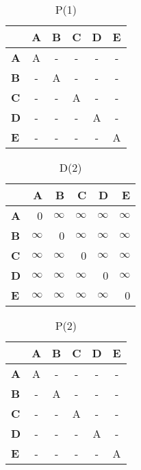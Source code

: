 \documentclass{article}
\newcommand{\INF}{$\infty$}
\begin{document}
\begin{table}[H]\centering
\caption{P(1)}
\begin{tabular}{l c c c c c}
\toprule
 & \textbf{A} & \textbf{B} & \textbf{C} & \textbf{D} & \textbf{E}\\\midrule
\textbf{A} & \cellcolor{yellow!30}A & - & - & - & - \\
\textbf{B} & - & \cellcolor{yellow!30}A & - & - & - \\
\textbf{C} & - & - & \cellcolor{yellow!30}A & - & - \\
\textbf{D} & - & - & - & \cellcolor{yellow!30}A & - \\
\textbf{E} & - & - & - & - & \cellcolor{yellow!30}A \\
\bottomrule
\end{tabular}
\end{table}

\begin{table}[H]\centering
\caption{D(2)}
\begin{tabular}{l r r r r r}
\toprule
 & \textbf{A} & \textbf{B} & \textbf{C} & \textbf{D} & \textbf{E}\\\midrule
\textbf{A} & 0 & \INF & \INF & \INF & \INF \\
\textbf{B} & \INF & 0 & \INF & \INF & \INF \\
\textbf{C} & \INF & \INF & 0 & \INF & \INF \\
\textbf{D} & \INF & \INF & \INF & 0 & \INF \\
\textbf{E} & \INF & \INF & \INF & \INF & 0 \\
\bottomrule
\end{tabular}
\end{table}

\begin{table}[H]\centering
\caption{P(2)}
\begin{tabular}{l c c c c c}
\toprule
 & \textbf{A} & \textbf{B} & \textbf{C} & \textbf{D} & \textbf{E}\\\midrule
\textbf{A} & A & - & - & - & - \\
\textbf{B} & - & A & - & - & - \\
\textbf{C} & - & - & A & - & - \\
\textbf{D} & - & - & - & A & - \\
\textbf{E} & - & - & - & - & A \\
\bottomrule
\end{tabular}
\end{table}
\end{document}
